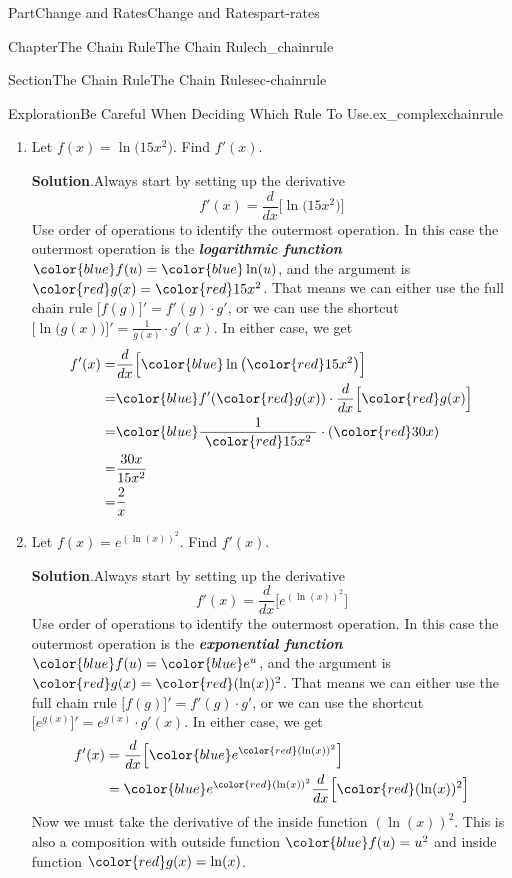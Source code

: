 \documentclass[oneside,10pt,]{tufte-book}
\newcommand{\blocktitlefont}{\relax}
\newcommand{\alert}[1]{\textbf{\textit{#1}}}
\numberwithin{equation}{chapter}
\newcommand{\red}[1]{   {\color{red}   #1}   }
\newcommand{\blue}[1]{  {\color{blue}  #1}  }
\newcommand{\ddx}[1]{ \dfrac{d}{dx} \Big[ #1 \Big]  }
\newcommand{\D}[1]{ \Big[ #1 \Big]'  }
\newcommand{\amp}{&}
\begin{document}
\begin{partptx}{Part}{Change and Rates}{}{Change and Rates}{}{}{part-rates}
\begin{chapterptx}{Chapter}{The Chain Rule}{}{The Chain Rule}{}{}{ch_chainrule}
\begin{sectionptx}{Section}{The Chain Rule}{}{The Chain Rule}{}{}{sec-chainrule}
\begin{exploration}{Exploration}{Be Careful When Deciding Which Rule To Use.}{ex_complexchainrule}
\begin{enumerate}[font=\bfseries,label=(\alph*),ref=\alph*]
%
\item{}Let \(f(x) = \ln\big(15x^2\big)\). Find \(f'(x)\).%
\par\smallskip%
\noindent\textbf{\blocktitlefont Solution}.\hypertarget{ex_complexchainrule-4-2}{}\quad{}Always start by setting up the derivative%
\begin{equation*}
f'(x) = \ddx{\ln\big(15x^2\big)}
\end{equation*}
Use order of operations to identify the outermost operation. In this case the outermost operation is the \alert{logarithmic function} \(\blue{f(u)} = \blue{\ln(u)}\), and the argument is \(\red{g(x)} = \red{15x^2}\).  That means we can either use the full chain rule \(\D{ f(g) } = f'(g)\cdot g'\), or we can use the shortcut \(\D{\ln\big(g(x)\big)} = \frac{1}{g(x)}\cdot g'(x)\).  In either case, we get%
\begin{align*}
f'(x) = \amp \ddx{ \blue{\ln\big(\red{15x^2}\big)} }  \\
= \amp \blue{f'(\red{g(x)})}\cdot \ddx{\red{g(x)}}\\
= \amp \blue{\dfrac{1}{\ \red{15x^2} \ }}\cdot (\red{30x})  \\
= \amp \dfrac{30x}{15x^2}\\
= \amp \dfrac{2}{x}
\end{align*}
%
\item{}Let \(f(x) = e^{(\ln(x))^2}\).  Find \(f'(x)\).%
\par\smallskip%
\noindent\textbf{\blocktitlefont Solution}.\hypertarget{ex_complexchainrule-5-2}{}\quad{}Always start by setting up the derivative%
\begin{equation*}
f'(x) = \ddx{e^{(\ln(x))^2}}
\end{equation*}
Use order of operations to identify the outermost operation. In this case the outermost operation is the \alert{exponential function} \(\blue{f(u)} = \blue{e^u}\), and the argument is \(\red{g(x)} = \red{(\ln(x))^2}\).  That means we can either use the full chain rule \(\D{ f(g) } = f'(g)\cdot g'\), or we can use the shortcut \(\D{e^{g(x)}} = e^{g(x)}\cdot g'(x)\).  In either case, we get%
\begin{align*}
f'(x) \amp = \ddx{ \blue{e^{\red{(\ln(x))^2}}} }\\
\amp =  \blue{e^{\red{(\ln(x))^2}}} \ddx{ \red{(\ln(x))^2} }
\end{align*}
Now we must take the derivative of the inside function \({(\ln(x))^2}\).  This is also a composition with outside function \(\blue{f(u)= u^2}\) and inside function \(\red{g(x) = \ln(x)}\).%

\end{enumerate}
\end{exploration}
\end{sectionptx}
\end{chapterptx}
\end{partptx}
\end{document}
